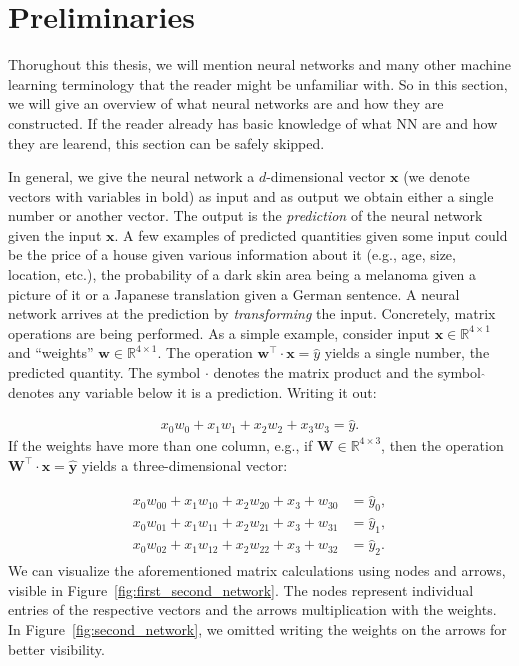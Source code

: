 \section{Preliminaries}

Thorughout this thesis, we will mention neural networks and many other machine learning terminology that the reader might be unfamiliar with. So in this section, we will give an overview of what neural networks are and how they are constructed. If the reader already has basic knowledge of what NN are and how they are learend, this section can be safely skipped.

In general, we give the neural network a $d$-dimensional vector $\bm{x}$ (we denote vectors with variables in bold) as input and as output we obtain either a single number or another vector. The output is the \textit{prediction} of the neural network given the input $\bm{x}$. A few examples of predicted quantities given some input could be the price of a house given various information about it (e.g., age, size, location, etc.), the probability of a dark skin area being a melanoma given a picture of it or a Japanese translation given a German sentence. A neural network arrives at the prediction by \textit{transforming} the input. Concretely, matrix operations are being performed. As a simple example, consider input $\bm{x} \in \mathds{R}^{4 \times 1}$ and \enquote{weights} $\bm{w} \in \mathds{R}^{4 \times 1}$. The operation $\bm{w}^\top \cdot \bm{x} = \hat{y}$ yields a single number, the predicted quantity. The symbol $\cdot$ denotes the matrix product and the symbol $\hat{}$ denotes any variable below it is a prediction. Writing it out:

\begin{align} \label{eq:first_network}
    x_0 w_0 + x_1 w_1 + x_2 w_2 + x_3 w _3 = \hat{y}.
\end{align} If the weights have more than one column, e.g., if $\bm{W} \in \mathds{R}^{4 \times 3}$, then the operation $\bm{W}^\top \cdot \bm{x} = \hat{\bm{y}}$ yields a three-dimensional vector:

\begin{align} \label{eq:second_network}
    \begin{split}
        x_0 w_{00} + x_1 w_{10} + x_2 w_{20} + x_3 + w_{30} & = \hat{y}_0, \\
        x_0 w_{01} + x_1 w_{11} + x_2 w_{21} + x_3 + w_{31} & = \hat{y}_1, \\
        x_0 w_{02} + x_1 w_{12} + x_2 w_{22} + x_3 + w_{32} & = \hat{y}_2.
    \end{split}
\end{align}We can visualize the aforementioned matrix calculations using nodes and arrows, visible in Figure~\ref{fig:first_second_network}. The nodes represent individual entries of the respective vectors and the arrows multiplication with the weights. In Figure~\ref{fig:second_network}, we omitted writing the weights on the arrows for better visibility.


